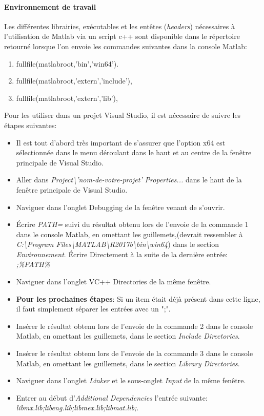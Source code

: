 \paragraph{Environnement de travail} Les différentes librairies, exécutables et les entêtes (\textit{headers})  nécessaires à l'utilisation de Matlab via un script c++ sont disponible dans le répertoire retourné lorsque l'on envoie les commandes suivantes dans la console Matlab:
\begin{enumerate}
\item fullfile(matlabroot,'bin','win64').
\item fullfile(matlabroot,'extern','include'),
\item fullfile(matlabroot,'extern','lib'),
\end{enumerate}

Pour les utiliser dans un projet Visual Studio, il est nécessaire de suivre les étapes suivantes:
\begin{itemize}
\item Il est tout d'abord très important de s'assurer que l'option x64 est sélectionnée dans le menu déroulant dans le haut et au centre de la fenêtre principale de Visual Studio.
\item Aller dans \textit{Project\textbackslash'nom-de-votre-projet' Properties...} dans le haut de la fenêtre principale de Visual Studio.
\item Naviguer dans l'onglet Debugging de la fenêtre venant de s'ouvrir.
\item Écrire \textit{PATH=} suivi du résultat obtenu lors de l'envoie de la commande 1 dans le console Matlab, en omettant les guillemets,(devrait ressembler à \newline \textit{C:\textbackslash Program Files\textbackslash MATLAB\textbackslash R2017b\textbackslash bin\textbackslash win64}) dans le section \textit{Environnement}.
Écrire Directement à la suite de la dernière entrée: \textit{;\%PATH\%}
\item Naviguer dans l'onglet VC++ Directories de la même fenêtre.
\item \textbf{Pour les prochaines étapes}: Si un item était déjà présent dans cette ligne, il faut simplement séparer les entrées avec un ";".
\item Insérer le résultat obtenu lors de l'envoie de la commande 2 dans le console Matlab, en omettant les guillemets, dans le section \textit{Include Directories}.
\item Insérer le résultat obtenu lors de l'envoie de la commande 3 dans le console Matlab, en omettant les guillemets, dans le section \textit{Library Directories}.
\item Naviguer dans l'onglet \textit{Linker} et le sous-onglet \textit{Input} de la même fenêtre.
\item Entrer au début d'\textit{Additional Dependencies} l'entrée suivante: \textit{libmx.lib;libeng.lib;libmex.lib;libmat.lib;}.
\end{itemize}

